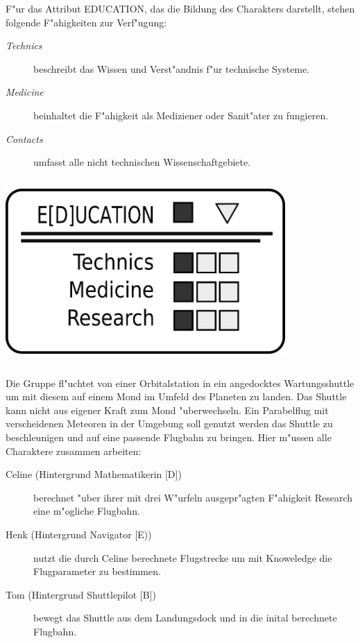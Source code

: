 \begin{column}[l]{0.55}
    F"ur das Attribut EDUCATION, das die Bildung des Charakters darstellt, stehen folgende F"ahigkeiten zur Verf"ugung:

    \begin{description}
        \item[\emph{Technics}] beschreibt das Wissen und Verst"andnis f"ur technische Systeme.
        \item[\emph{Medicine}] beinhaltet die F"ahigkeit als Mediziener oder Sanit"ater zu fungieren.
        \item[\emph{Contacts}] umfasst alle nicht technischen Wissenschaftgebiete.
    \end{description}
\end{column}
\begin{column}[r]{0.45}
    \centering
    \includegraphics[width=0.80\textwidth]{images/character_education}
\end{column}

\medskip
\begin{ruleexample}
    Die Gruppe fl"uchtet von einer Orbitalstation in ein angedocktes Wartungsshuttle um mit diesem auf einem Mond im Umfeld des Planeten zu landen. Das Shuttle kann nicht aus eigener Kraft zum Mond "uberwechseln. Ein Parabelflug mit verscheidenen Meteoren in der Umgebung soll genutzt werden das Shuttle zu beschleunigen und auf eine passende Flugbahn zu bringen. Hier m"ussen alle Charaktere zusammen arbeiten:

\begin{description}
        \item[Celine ({Hintergrund Mathematikerin [D]})] berechnet "uber ihrer mit drei W"urfeln ausgepr"agten F"ahigkeit Research eine 
            m"ogliche Flugbahn.
        \item[Henk ({Hintergrund Navigator [E)})] nutzt die durch Celine berechnete Flugstrecke um mit Knoweledge die Flugparameter zu 
            bestimmen.
        \item[Tom ({Hintergrund Shuttlepilot [B]})] bewegt das Shuttle aus dem Landungsdock und in die inital berechnete Flugbahn.
    \end{description}
\end{ruleexample}

